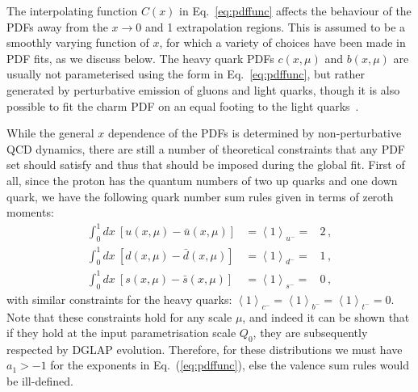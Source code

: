 The interpolating function $C(x)$ in
Eq.~\eqref{eq:pdffunc}
affects the behaviour of the PDFs away from the $x\to 0$ and 1
extrapolation regions.
%
This is assumed to be a smoothly varying function of $x$, for which a variety of choices have been made in PDF fits, as we discuss below.
%
The heavy quark PDFs $c(x,\mu)$ and $b(x,\mu)$ are usually not
parameterised using the form in  Eq.~\eqref{eq:pdffunc}, but rather
generated by perturbative emission of gluons and light quarks,
though it is also possible to fit the charm PDF on an equal footing
to the light quarks~\cite{Ball:2016neh}.

While the general $x$ dependence of the PDFs is determined by
non-perturbative QCD dynamics, there are still a number
of theoretical constraints that any PDF set should satisfy and thus that
should be imposed during the global fit.
%
First of all, since
the proton has the quantum numbers of two up quarks and one down quark,
we have the following quark number sum rules given in terms of zeroth
moments: 
%
\begin{eqnarray}
\int_{0}^{1}dx\ \left[u(x,\mu)-\bar{u}(x,\mu)\right] & =\left\langle 1\right\rangle _{u^{-}}= & 2 \, ,\nonumber \\
\int_{0}^{1}dx\ \left[d(x,\mu)-\bar{d}(x,\mu)\right] & =\left\langle 1\right\rangle _{d^{-}}= & 1 \, ,
\label{eq:valencesumrules}\\
\int_{0}^{1}dx\ \left[s(x,\mu)-\bar{s}(x,\mu)\right] & =\left\langle 1\right\rangle _{s^{-}}= & 0 \, ,\nonumber
\end{eqnarray}
with similar constraints for the heavy quarks: $\left\langle 1\right\rangle _{c^{-}}=\left\langle 1\right\rangle _{b^{-}}=\left\langle 1\right\rangle _{t^{-}}=0$.
%
Note that these constraints hold for any scale $\mu$, and indeed it can be shown
that if they hold at the input parametrisation scale $Q_0$, they
are subsequently respected by DGLAP evolution.
%
Therefore, for these distributions we must have $a_1>-1$ for the exponents in
Eq.~(\ref{eq:pdffunc}), else the valence sum rules would be ill-defined.

